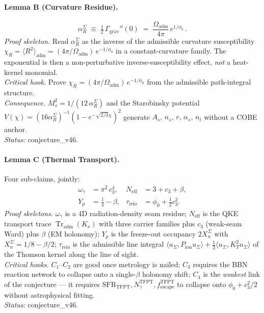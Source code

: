 \paragraph{Lemma B (Curvature Residue).}
\begin{equation}
\alpha_R^\Sigma \;\equiv\;
\tfrac12\,\Gamma_{\mathrm{grav}}''(0) \;=\;
\frac{\Omega_{\mathrm{adm}}}{4\pi}\,e^{1/\phi_0} \,.
\label{eq:lemmaB}
\end{equation}
\emph{Proof skeleton.} Read \(\alpha_R^\Sigma\) as the inverse of the
admissible curvature susceptibility
\(\chi_R = \langle R^2\rangle_{\mathrm{adm}}
= (4\pi/\Omega_{\mathrm{adm}})\,e^{-1/\phi_0}\) in a constant-curvature
family.  The exponential is then a non-perturbative
inverse-susceptibility effect, \emph{not} a heat-kernel monomial.\\
\emph{Critical hook.} Prove
\(\chi_R = (4\pi/\Omega_{\mathrm{adm}})\,e^{-1/\phi_0}\) from the
admissible path-integral structure.\\
\emph{Consequence.} \(M_s^2 = 1/(12\,\alpha_R^\Sigma)\) and the
Starobinsky potential \(V(\chi)=
(16\alpha_R^\Sigma)^{-1}(1-e^{-\sqrt{2/3}\chi})^2\) generate
\(A_s,\,n_s,\,r,\,\alpha_s,\,n_t\) without a COBE anchor.\\
\emph{Status:} \textsf{conjecture\_v46}.

\paragraph{Lemma C (Thermal Transport).}
Four sub-claims, jointly:
\begin{align}
\omega_\gamma &= \pi^2\,c_3^4, &
N_{\mathrm{eff}} &= 3 + c_3 + \beta, \nonumber\\
Y_p &= \tfrac14 - \beta, &
\tau_{\mathrm{reio}} &= \phi_0 + \tfrac12 c_3^2 .
\label{eq:lemmaC}
\end{align}
\emph{Proof skeletons.}
\(\omega_\gamma\) is a 4D radiation-density seam residue;
\(N_{\mathrm{eff}}\) is the QKE transport trace
\(\operatorname{Tr}_{\mathrm{adm}}(K_\nu)\) with three carrier
families plus \(c_3\) (weak-seam Ward) plus \(\beta\) (EM holonomy);
\(Y_p\) is the freeze-out occupancy \(2 X_n^\Sigma\) with
\(X_n^\Sigma = 1/8 - \beta/2\); \(\tau_{\mathrm{reio}}\) is the
admissible line integral
\(\langle u_\Sigma,P_{\mathrm{ion}} u_\Sigma\rangle
+\tfrac12 \langle u_\Sigma, K_T^2 u_\Sigma\rangle\) of the Thomson
kernel along the line of sight.\\
\emph{Critical hooks.} \(C_1\)--\(C_2\) are good once metrology is
nailed; \(C_3\) requires the BBN reaction network to collapse onto a
single-\(\beta\) holonomy shift; \(C_4\) is the
\emph{weakest} link of the conjecture --- it requires
\(\mathrm{SFR}_{\mathrm{TFPT}},
N_\gamma^{\mathrm{TFPT}}, f_{\mathrm{escape}}^{\mathrm{TFPT}}\) to
collapse onto \(\phi_0+c_3^2/2\) without astrophysical fitting.\\
\emph{Status:} \textsf{conjecture\_v46}.

